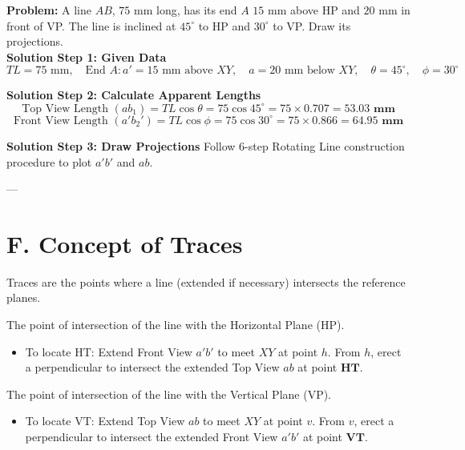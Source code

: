 \begin{example}
\textbf{Problem:} A line $AB$, $75\text{ mm}$ long, has its end $A$ $15\text{ mm}$ above HP and $20\text{ mm}$ in front of VP. The line is inclined at $45^\circ$ to HP and $30^\circ$ to VP. Draw its projections.\\[4pt]
\textbf{Solution Step 1: Given Data}
$$TL = 75\text{ mm}, \quad \text{End } A: a' = 15\text{ mm above } XY, \quad a = 20\text{ mm below } XY, \quad \theta = 45^\circ, \quad \phi = 30^\circ$$

\noindent \textbf{Solution Step 2: Calculate Apparent Lengths}
$$\text{Top View Length } (ab_1) = TL \cos \theta = 75 \cos 45^\circ = 75 \times 0.707 = \mathbf{53.03\text{ mm}}$$
$$\text{Front View Length } (a'b_2') = TL \cos \phi = 75 \cos 30^\circ = 75 \times 0.866 = \mathbf{64.95\text{ mm}}$$

\noindent \textbf{Solution Step 3: Draw Projections}
Follow 6-step Rotating Line construction procedure to plot $a'b'$ and $ab$.
\end{example}

---

\section{F. Concept of Traces}

Traces are the points where a line (extended if necessary) intersects the reference planes.

\begin{definition}
The point of intersection of the line with the Horizontal Plane (HP).
\begin{itemize}
    \item To locate $\text{HT}$: Extend Front View $a'b'$ to meet $XY$ at point $h$. From $h$, erect a perpendicular to intersect the extended Top View $ab$ at point $\mathbf{\text{HT}}$.
\end{itemize}
\end{definition}

\begin{definition}
The point of intersection of the line with the Vertical Plane (VP).
\begin{itemize}
    \item To locate $\text{VT}$: Extend Top View $ab$ to meet $XY$ at point $v$. From $v$, erect a perpendicular to intersect the extended Front View $a'b'$ at point $\mathbf{\text{VT}}$.
\end{itemize}
\end{definition}

